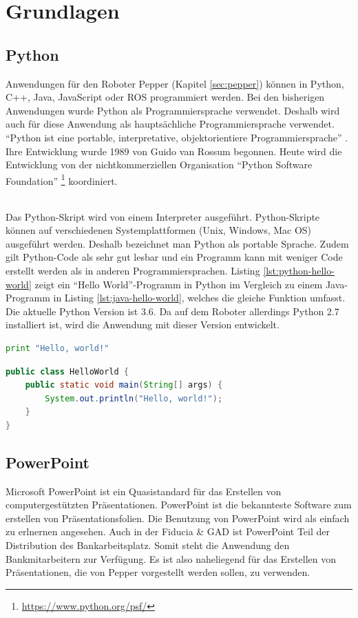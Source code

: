 \chapter{Grundlagen}\label{sec:grundlagen}
\section{Python}\label{sec:python}
Anwendungen für den Roboter Pepper (Kapitel \ref{sec:pepper}) können in Python,
C++, Java, JavaScript oder ROS programmiert werden. \cite{SoftBankIII2018} Bei
den bisherigen Anwendungen wurde Python als Programmiersprache verwendet.
Deshalb wird auch für diese Anwendung als
hauptsächliche Programmiersprache verwendet. "`Python ist eine portable,
interpretative, objektorientiere Programmiersprache"' \cite{Weigend2017}. Ihre
Entwicklung wurde 1989 von Guido van Rossum begonnen. Heute wird die Entwicklung
von der nichtkommerziellen Organisation "`Python Software Foundation"'
\footnote{\url{https://www.python.org/psf/}} koordiniert.

\subparagraph{}
Das Python-Skript wird von einem Interpreter ausgeführt. Python-Skripte können
auf verschiedenen Systemplattformen (Unix, Windows, Mac OS) ausgeführt werden.
Deshalb bezeichnet man Python als portable Sprache. Zudem gilt Python-Code als
sehr gut lesbar und ein Programm kann mit weniger Code erstellt
werden als in anderen Programmiersprachen. Listing \ref{lst:python-hello-world}
zeigt ein "`Hello World"'-Programm in Python im Vergleich zu einem Java-Programm
in Listing \ref{lst:java-hello-world}, welches die gleiche Funktion umfasst.
Die aktuelle Python Version ist 3.6.
Da auf dem Roboter allerdings Python 2.7 installiert ist, wird die Anwendung mit
dieser Version entwickelt. \cite{Weigend2017}

\begin{lstlisting}[float, language=Python, frame=single, framexleftmargin=15pt,
style=algoBericht, label={lst:python-hello-world}, captionpos=b, caption={Hello
World in Python}]
print "Hello, world!"
\end{lstlisting}

\begin{lstlisting}[float, language=Java, frame=single, framexleftmargin=15pt,
style=algoBericht, label={lst:java-hello-world}, captionpos=b, caption={Hello
World in Java}]
public class HelloWorld { 
	public static void main(String[] args) {
		System.out.println("Hello, world!"); 
	}
}
\end{lstlisting}

\section{PowerPoint}\label{sec:powerpoint}
Microsoft PowerPoint ist ein Quasistandard für das Erstellen von
computergestützten Präsentationen. PowerPoint ist die bekannteste Software zum
erstellen von Präsentationsfolien. Die Benutzung von
PowerPoint wird als einfach zu erlnernen angesehen. \cite{Thielsch2012} Auch in
der Fiducia \& GAD ist PowerPoint Teil der Distribution des Bankarbeitsplatz.
Somit steht die Anwendung den Bankmitarbeitern zur Verfügung. Es ist also
naheliegend für das Erstellen von Präsentationen, die von Pepper vorgestellt
werden sollen, zu verwenden.

